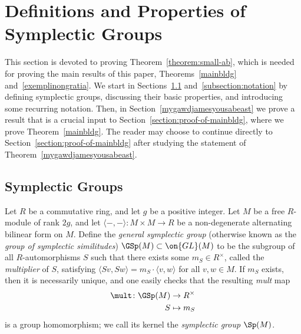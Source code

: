 \section{Definitions and Properties of Symplectic Groups}
\label{section:group-theory}

This section is devoted to proving Theorem~\ref{theorem:small-ab},
which is needed for proving the main results of this paper, Theorems~\ref{mainbldg} and~\ref{exemplinongratia}. We start in Sections~\ref{subsection:stimpy} and~\ref{subsection:notation} by defining symplectic groups, discussing their basic properties, and introducing some recurring notation. Then, in Section~\ref{mygawdjamesyousabeast} we prove a result that is a crucial input to Section~\ref{section:proof-of-mainbldg}, where we prove Theorem~\ref{mainbldg}.
The reader may choose to continue directly to Section~\ref{section:proof-of-mainbldg} after studying the statement of Theorem~\ref{mygawdjamesyousabeast}.

\subsection{Symplectic Groups}\label{subsection:stimpy}

Let $R$ be a commutative ring, and let $g$ be a positive integer. Let $M$ be a free $R$-module of rank $2g$, and let $\langle -, - \rangle \colon M \times M \to R$ be a non-degenerate alternating bilinear form on $M$. Define the {\it general symplectic group} (otherwise known as the \emph{group of symplectic similitudes}) $\GSp(M) \subset \on{GL}(M)$ to be the subgroup of all $R$-automorphisms $S$ such that there exists some $m_S \in R^\times$, called the {\it multiplier} of $S$, satisfying $\langle S v, Sw \rangle = m_S \cdot \langle v, w \rangle$ for all $v, w \in M$. If $m_S$ exists, then it is necessarily unique, and one easily checks that the resulting {\it mult} map 
\begin{align*}
	\mult \colon \GSp(M) & \rightarrow R^\times \\
	S & \mapsto m_S
\end{align*}
is a group homomorphism; we call its kernel the {\it symplectic group} $\Sp(M)$.

